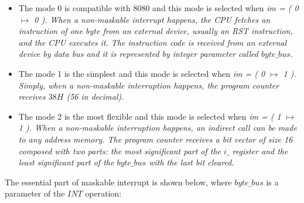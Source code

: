 \documentclass[a4paper]{llncs}
\begin{document}
 \begin{itemize}
   
  \item The mode 0 is compatible with 8080 and this mode is selected when \it im \rm = \rm ( \rm 0 $\mapsto$  \rm 0 \rm ). When a  non-maskable interrupt happens, the CPU fetches an instruction of one byte
  from an external device, usually an RST instruction, and the CPU executes it.
  The instruction code is received from an external device by data bus and it is represented by integer parameter called $\textit{byte\_bus}$.

 
  \item The mode 1 is the simplest and this mode is selected when \it im \rm = \rm ( \rm 0  $\mapsto$  \rm 1
  \rm ). Simply, when a non-maskable interruption happens, the program counter
  receives $38H$ (56 in decimal).
  
  \item The mode 2 is the most flexible and this mode is selected when \it im \rm = \rm ( \rm 1  $\mapsto$
  \rm 1 \rm ). When a non-maskable interruption happens, an indirect call can be
  made to any address memory. The program counter receives a bit vector of size
  16 composed with two parts: the most significant part of the $\textit{i\_}$
  register and the least significant part of the $\textit{byte\_bus}$ with the
  last bit cleared.
  
 \end{itemize}

The essential part of maskable interrupt is shown below, where $\textit{byte\_bus}$ is a parameter of the $\textit{INT}$ operation:
 
\end{document}
